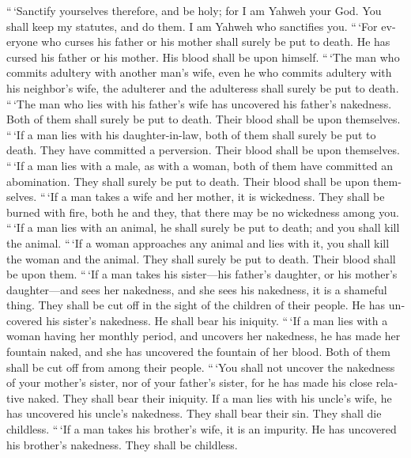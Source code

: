 \begin{paracol}{2}
\begin{otherlanguage}{english}
 ``\,`Sanctify yourselves therefore, and be holy; for I am
Yahweh your God.  You shall keep my statutes, and do them.
I am Yahweh who sanctifies you.  ``\,`For everyone who
curses his father or his mother shall surely be put to death. He has
cursed his father or his mother. His blood shall be upon himself.
 ``\,`The man who commits adultery with another man's
wife, even he who commits adultery with his neighbor's wife, the
adulterer and the adulteress shall surely be put to death.
 ``\,`The man who lies with his father's wife has
uncovered his father's nakedness. Both of them shall surely be put to
death. Their blood shall be upon themselves.  ``\,`If a
man lies with his daughter-in-law, both of them shall surely be put to
death. They have committed a perversion. Their blood shall be upon
themselves.  ``\,`If a man lies with a male, as with a
woman, both of them have committed an abomination. They shall surely be
put to death. Their blood shall be upon themselves. 
``\,`If a man takes a wife and her mother, it is wickedness. They shall
be burned with fire, both he and they, that there may be no wickedness
among you.  ``\,`If a man lies with an animal, he shall
surely be put to death; and you shall kill the animal. 
``\,`If a woman approaches any animal and lies with it, you shall kill
the woman and the animal. They shall surely be put to death. Their blood
shall be upon them.  ``\,`If a man takes his sister---his
father's daughter, or his mother's daughter---and sees her nakedness,
and she sees his nakedness, it is a shameful thing. They shall be cut
off in the sight of the children of their people. He has uncovered his
sister's nakedness. He shall bear his iniquity.  ``\,`If
a man lies with a woman having her monthly period, and uncovers her
nakedness, he has made her fountain naked, and she has uncovered the
fountain of her blood. Both of them shall be cut off from among their
people.  ``\,`You shall not uncover the nakedness of your
mother's sister, nor of your father's sister, for he has made his close
relative naked. They shall bear their iniquity.  If a man
lies with his uncle's wife, he has uncovered his uncle's nakedness. They
shall bear their sin. They shall die childless.  ``\,`If
a man takes his brother's wife, it is an impurity. He has uncovered his
brother's nakedness. They shall be childless.


\end{otherlanguage}
\end{paracol}
